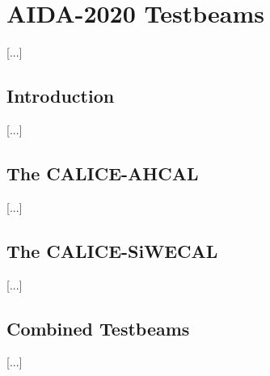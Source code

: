 \chapter{AIDA-2020 Testbeams}
[...]

\section{Introduction}
[...]

\section{The CALICE-AHCAL}
[...]

\section{The CALICE-SiWECAL}
[...]

\section{Combined Testbeams}
[...]